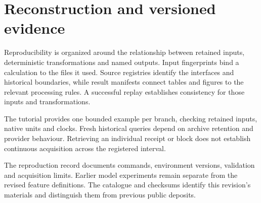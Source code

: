 \section{Reconstruction and versioned evidence}
\label{app:reproduction}

Reproducibility is organized around the relationship between retained inputs, deterministic transformations and named outputs. Input fingerprints bind a calculation to the files it used. Source registries identify the interfaces and historical boundaries, while result manifests connect tables and figures to the relevant processing rules. A successful replay establishes consistency for those inputs and transformations.

The tutorial provides one bounded example per branch, checking retained inputs, native units and clocks. Fresh historical queries depend on archive retention and provider behaviour. Retrieving an individual receipt or block does not establish continuous acquisition across the registered interval.

The reproduction record documents commands, environment versions, validation and acquisition limits. Earlier model experiments remain separate from the revised feature definitions. The catalogue and checksums identify this revision's materials and distinguish them from previous public deposits.
